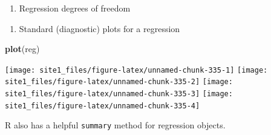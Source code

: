 \documentclass[]{book}
\newenvironment{Shaded}{\begin{snugshade}}{\end{snugshade}}
\newcommand{\KeywordTok}[1]{\textcolor[rgb]{0.13,0.29,0.53}{\textbf{#1}}}
\newcommand{\CommentTok}[1]{\textcolor[rgb]{0.56,0.35,0.01}{\textit{#1}}}
\newcommand{\OperatorTok}[1]{\textcolor[rgb]{0.81,0.36,0.00}{\textbf{#1}}}
\newcommand{\NormalTok}[1]{#1}
\providecommand{\tightlist}{%
  \setlength{\itemsep}{0pt}\setlength{\parskip}{0pt}}
\begin{document}
\begin{enumerate}
\def\labelenumi{\arabic{enumi}.}
\setcounter{enumi}{2}
\tightlist
\item
  Regression degrees of freedom
\end{enumerate}

\begin{Shaded}
\end{Shaded}

\begin{enumerate}
\def\labelenumi{\arabic{enumi}.}
\setcounter{enumi}{3}
\tightlist
\item
  Standard (diagnostic) plots for a regression
\end{enumerate}

\begin{Shaded}
\begin{Highlighting}[]
\KeywordTok{plot}\NormalTok{(reg)}
\end{Highlighting}
\end{Shaded}

\begin{center}\texttt{[image: site1\_files/figure-latex/unnamed-chunk-335-1]} \texttt{[image: site1\_files/figure-latex/unnamed-chunk-335-2]} \texttt{[image: site1\_files/figure-latex/unnamed-chunk-335-3]} \texttt{[image: site1\_files/figure-latex/unnamed-chunk-335-4]} \end{center}

R also has a helpful \texttt{summary} method for regression objects.
\end{document}
